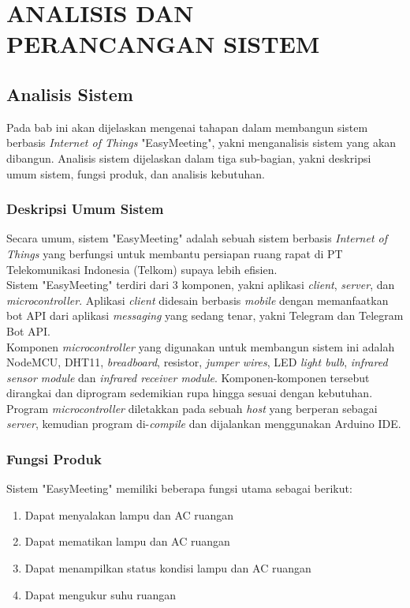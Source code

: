 \chapter{ANALISIS DAN PERANCANGAN SISTEM}
\section{Analisis Sistem}
\tab Pada bab ini akan dijelaskan mengenai tahapan dalam membangun sistem berbasis \textit{Internet of Things} "EasyMeeting", yakni menganalisis sistem yang akan dibangun. Analisis sistem dijelaskan dalam tiga sub-bagian, yakni deskripsi umum sistem, fungsi produk, dan analisis kebutuhan.

\subsection{Deskripsi Umum Sistem}
\tab Secara umum, sistem "EasyMeeting" adalah sebuah sistem berbasis \textit{Internet of Things} yang berfungsi untuk membantu persiapan ruang rapat di PT Telekomunikasi Indonesia (Telkom) supaya lebih efisien.\\
\tab Sistem "EasyMeeting" terdiri dari 3 komponen, yakni aplikasi \textit{client}, \textit{server}, dan \textit{microcontroller}. Aplikasi \textit{client} didesain berbasis \textit{mobile} dengan memanfaatkan bot API dari aplikasi \textit{messaging} yang sedang tenar, yakni Telegram dan Telegram Bot API. \\
\tab Komponen \textit{microcontroller} yang digunakan untuk membangun sistem ini adalah NodeMCU, DHT11, \textit{breadboard}, resistor, \textit{jumper wires}, LED \textit{light bulb}, \textit{infrared sensor module} dan \textit{infrared receiver module}. Komponen-komponen tersebut dirangkai dan diprogram sedemikian rupa hingga sesuai dengan kebutuhan. Program \textit{microcontroller} diletakkan pada sebuah \textit{host} yang berperan sebagai \textit{server}, kemudian program di-\textit{compile} dan dijalankan menggunakan Arduino IDE.

\subsection{Fungsi Produk}
\tab Sistem "EasyMeeting" memiliki beberapa fungsi utama sebagai berikut:
\begin{enumerate}
	\item Dapat menyalakan lampu dan AC ruangan
	\item Dapat mematikan lampu dan AC ruangan
	\item Dapat menampilkan status kondisi lampu dan AC ruangan
	\item Dapat mengukur suhu ruangan
\end{enumerate}


